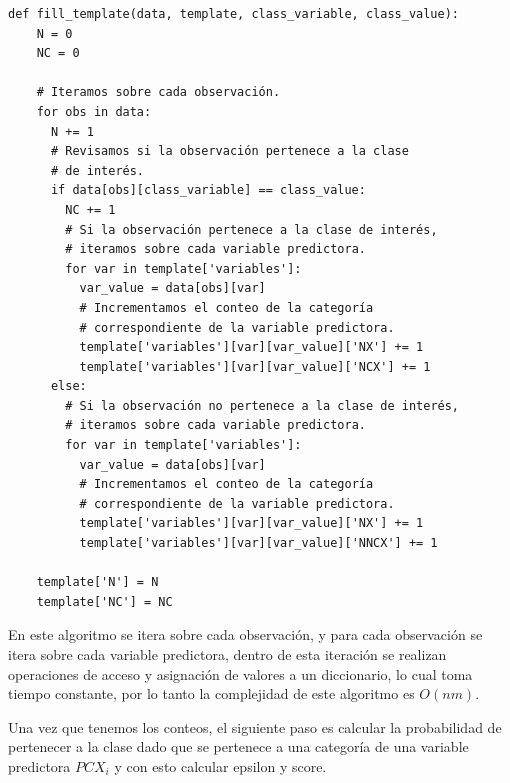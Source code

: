\documentclass[
 12pt,
 letterpaper,
]{article}
\theoremstyle{teoremaBreak}
\theoremstyle{plain}
\theoremstyle{definition}
\begin{document}
\begin{lstlisting}[style=pseudocodigo]
  def fill_template(data, template, class_variable, class_value):
    N = 0
    NC = 0

    # Iteramos sobre cada observación.
    for obs in data:
      N += 1
      # Revisamos si la observación pertenece a la clase
      # de interés.
      if data[obs][class_variable] == class_value:
        NC += 1
        # Si la observación pertenece a la clase de interés, 
        # iteramos sobre cada variable predictora.
        for var in template['variables']:
          var_value = data[obs][var]
          # Incrementamos el conteo de la categoría 
          # correspondiente de la variable predictora.
          template['variables'][var][var_value]['NX'] += 1
          template['variables'][var][var_value]['NCX'] += 1
      else:
        # Si la observación no pertenece a la clase de interés, 
        # iteramos sobre cada variable predictora.
        for var in template['variables']:
          var_value = data[obs][var]
          # Incrementamos el conteo de la categoría
          # correspondiente de la variable predictora.
          template['variables'][var][var_value]['NX'] += 1
          template['variables'][var][var_value]['NNCX'] += 1

    template['N'] = N
    template['NC'] = NC
\end{lstlisting}

En este algoritmo se itera sobre cada observación, y para cada observación se itera sobre cada variable 
predictora, dentro de esta iteración se realizan operaciones de acceso y asignación de valores a un diccionario, 
lo cual toma tiempo constante, por lo tanto la complejidad de este algoritmo es $O(nm)$.

Una vez que tenemos los conteos, el siguiente paso es calcular la probabilidad de pertenecer a la clase 
dado que se pertenece a una categoría de una variable predictora $PCX_{i}$ y con esto calcular epsilon y score.
\end{document}
